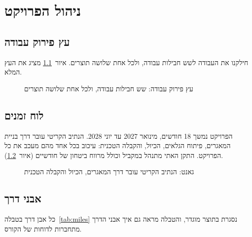 \chapter{ניהול הפרויקט}\label{ch:mgmt}

\section{עץ פירוק עבודה}

חילקנו את העבודה לשש חבילות עבודה, ולכל אחת שלושה תוצרים. איור~\ref{fig:wbs} מציג את העץ המלא.

\begin{figure}[!htb]
\begin{ltrdiagram}

\end{ltrdiagram}
\caption{עץ פירוק עבודה: שש חבילות עבודה, ולכל אחת שלושה תוצרים}\label{fig:wbs}
\end{figure}

\section{לוח זמנים}
הפרויקט נמשך \num{18} חודשים, מינואר \num{2027} עד יוני \num{2028}. הנתיב הקריטי עובר דרך בניית המאגרים, פיתוח הגלאים, הכיול, והקבלה הטכנית: עיכוב בכל אחד מהם מעכב את כל הפרויקט. התקן האתי מתנהל במקביל וכולל מרווח ביטחון של חודשיים (איור~\ref{fig:gantt}).

\begin{figure}[!htb]
\begin{ltrdiagram}

\end{ltrdiagram}
\caption{גאנט: הנתיב הקריטי עובר דרך המאגרים, הכיול והקבלה הטכנית}\label{fig:gantt}
\end{figure}

\section{אבני דרך}

כל אבן דרך בטבלה~\ref{tab:miles} נסגרת בתוצר מוגדר, והטבלה מראה גם איך אבני הדרך מתחברות לדוחות של הקורס.


